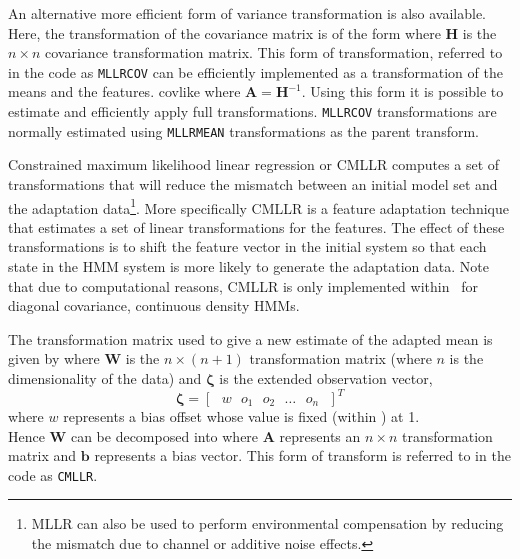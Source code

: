 An alternative more efficient form of variance transformation is also available.
Here, the transformation of the covariance matrix is  of the form
where $\bm{H}$ is the $n\times n$ covariance transformation matrix.
This form of transformation, referred to in the code as {\tt MLLRCOV}
can be efficiently implemented as a transformation of the means and 
the features.
 {covlike}
where $\bm{A}=\bm{H}^{-1}$.
Using this form it is possible to estimate and efficiently apply full transformations.
{\tt MLLRCOV} transformations are normally estimated using {\tt MLLRMEAN} transformations
as the parent transform.


Constrained maximum likelihood linear regression or CMLLR
computes a set of transformations that will reduce the mismatch
between an initial model set and the adaptation data\footnote{
MLLR can also be used to perform environmental compensation by
reducing the mismatch due to channel or additive noise effects.}.
More specifically CMLLR is a feature adaptation technique
that estimates a set of linear transformations for the features. 
The effect of these transformations is to shift the
feature vector in the initial system 
so that each state in the HMM system is more likely to generate the 
adaptation data.
Note that due to computational reasons, CMLLR is only implemented
within \HTK\ for diagonal covariance, continuous density
HMMs.

The transformation matrix used to give a new estimate of the adapted mean is
given by
where $\bm{W}$ is the $n \times \left( n + 1 \right)$
transformation matrix (where $n$ is the dimensionality of the data)
and $\bm{\zeta}$ is the extended observation vector,
\[
        \bm{\zeta} = \left[\mbox{ }w\mbox{ }o_1\mbox{ }o_2\mbox{ }\dots\mbox{ }o_n\mbox{ }\right]^T
\]
where $w$ represents a bias offset whose value is fixed (within \HTK) at 1.\\
Hence $\bm{W}$ can be decomposed into
where $\bm{A}$ represents an $n \times n$
transformation matrix and $\bm{b}$ represents a bias vector.
This form of transform is referred to in the code as {\tt CMLLR}.

